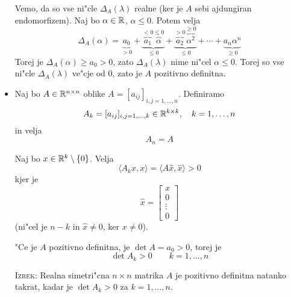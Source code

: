 \begin{itemize}
    Vemo, da so vse ni"cle $\Delta_A(\lambda)$ realne (ker je $A$ sebi ajdungiran endomorfizem). Naj bo $\alpha \in \mathbb{R}$, $\alpha \leq 0$. Potem velja
    \begin{equation*}
    \Delta_A(\alpha) = \underbrace{a_0}_{>0} + \underbrace{\overbrace{a_1}^{< 0} \overbrace{\alpha}^{\leq 0}}_{\leq 0} + \underbrace{\overbrace{a_2}^{>0} \overbrace{\alpha^2}^{\geq 0}}_{\leq 0} + \cdots +\underbrace{ a_n \alpha^n}_{\geq 0}
    \end{equation*}
    Torej je $\Delta_A(\alpha) \geq a_0 > 0$, zato $\Delta_A(\lambda)$ nime ni"cel $\alpha \leq 0$. Torej so vse ni"cle $\Delta_A(\lambda)$ ve"cje od 0, zato je $A$ pozitivno definitna.
    
    \item Naj bo $A \in \mathbb{R}^{n \times n}$ oblike $A = [a_{ij}]_{i,j=1, \ldots, n}$. Definiramo
    \begin{equation*}
    A_k = [a_{ij}]_{i,j = 1, \ldots, k} \in \mathbb{R}^{k \times k}, \quad k = 1, \ldots, n
    \end{equation*}
    in velja
    \begin{equation*}
    A_n = A
    \end{equation*}
    
    Naj bo $x \in \mathbb{R}^k \setminus \{ 0 \}$. Velja
    \begin{equation*}
    \langle A_k x, x \rangle = \langle A \hat{x}, \hat{x} \rangle > 0
    \end{equation*}
    kjer je
    \begin{equation*}
    \hat{x} = \begin{bmatrix}
    x \\
    0 \\
    \vdots \\
    0
    \end{bmatrix}
    \end{equation*}
    (ni"cel je $n - k$ in $\hat{x} \neq 0$, ker $x \neq 0$).
    
    "Ce je $A$ pozitivno definitna, je $\det A = a_0 > 0$, torej je 
    \begin{equation*}
    \det A_k > 0 \qquad k = 1, \ldots, n
    \end{equation*}
    
    \textsc{Izrek:} Realna simetri"cna $n \times n$ matrika $A$ je pozitivno definitna natanko takrat, kadar je $\det A_k > 0$ za $k = 1, \ldots, n$.
\end{itemize}

